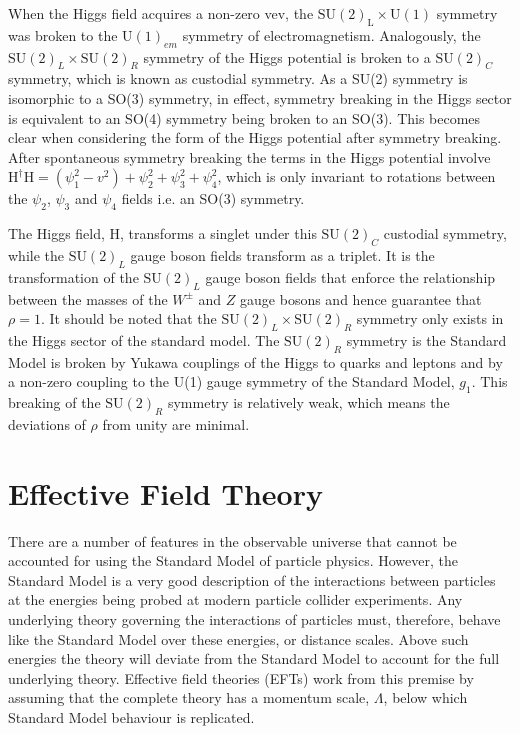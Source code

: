 When the Higgs field acquires a non-zero vev, the $\text{SU}(2)_{\text{L}} \times \text{U}(1)$ symmetry was broken to the $\text{U}(1)_{em}$ symmetry of electromagnetism.  Analogously, the $\text{SU}(2)_{L} \times \text{SU}(2)_{R}$ symmetry of the Higgs potential is broken to a $\text{SU}(2)_{C}$ symmetry, which is known as custodial symmetry.  As a SU(2) symmetry is isomorphic to a SO(3) symmetry, in effect, symmetry breaking in the Higgs sector is equivalent to an SO(4) symmetry being broken to an SO(3).  This becomes clear when considering the form of the Higgs potential after symmetry breaking.  After spontaneous symmetry breaking the terms in the Higgs potential involve $\text{H}^{\dagger}\text{H} = (\psi_{1}^{2}-v^{2}) + \psi_{2}^{2} + \psi_{3}^{2} + \psi_{4}^{2}$, which is only invariant to rotations between the $\psi_{2}$,  $\psi_{3}$ and  $\psi_{4}$ fields i.e. an SO(3) symmetry.

The Higgs field, H, transforms a singlet under this $\text{SU}(2)_{C}$ custodial symmetry, while the $\text{SU}(2)_{L}$ gauge boson fields transform as a triplet.  It is the transformation of the  $\text{SU}(2)_{L}$ gauge boson fields that enforce the relationship between the masses of the $W^{\pm}$ and $Z$ gauge bosons and hence guarantee that $\rho = 1$.  It should be noted that the $\text{SU}(2)_{L} \times \text{SU}(2)_{R}$ symmetry only exists in the Higgs sector of the standard model.  The $\text{SU}(2)_{R}$ symmetry is the Standard Model is broken by Yukawa couplings of the Higgs to quarks and leptons and by a non-zero coupling to the U(1) gauge symmetry of the Standard Model, $g_{1}$.  This breaking of the $\text{SU}(2)_{R}$ symmetry is relatively weak, which means the deviations of $\rho$ from unity are minimal.  


\section{Effective Field Theory}
\cite{Ellis:2013jnq}
There are a number of features in the observable universe that cannot be accounted for using the Standard Model of particle physics.  However, the Standard Model is a very good description of the interactions between particles at the energies being probed at modern particle collider experiments.  Any underlying theory governing the interactions of particles must, therefore, behave like the Standard Model over these energies, or distance scales.  Above such energies the theory will deviate from the Standard Model to account for the full underlying theory.  Effective field theories (EFTs) work from this premise by assuming that the complete theory  has a momentum scale, $\Lambda$, below which Standard Model behaviour is replicated.  

